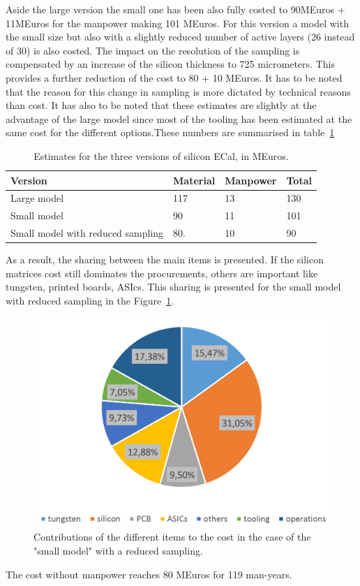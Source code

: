 Aside the large version the small one has been also fully costed to 90MEuros + 11MEuros for the manpower making 101 MEuros. For this version a model with the small size but also with a slightly reduced number of active layers (26 instead of 30) is also costed. The impact on the resolution of the sampling is compensated by an increase of the silicon thickness to 725 micrometers. This provides a further reduction of the cost to 80 + 10 MEuros. It has to be noted that the reason for this change in sampling is more dictated by technical reasons than cost. It has also to be noted that these estimates are slightly at the advantage of the large model since most of the tooling has been estimated at the same cost for the different options.These numbers are summarised in table~\ref{ECal_summary}
\begin{table}\hspace*{-0cm}\small 
\begin{tabular}[h!]{ l p{0.2\hsize}p{0.2\hsize}p{0.2\hsize} }
\toprule
Version& Material & Manpower & Total \\
\midrule
Large model                       & 117   & 13    & 130   \\
Small model                       & 90    & 11    & 101   \\
Small model with reduced sampling & 80.   & 10    & 90  \\
\bottomrule
\end{tabular}
\caption{\label{ECal_summary}Estimates for the three versions of silicon ECal, in MEuros.}
\end{table}

As a result, the sharing between the main items is presented. If the silicon matrices cost still dominates the procurements, others are important like tungsten, printed boards, ASIcs. This sharing is presented for the small model with reduced sampling in the Figure~\ref{fig:det:ECal26_Si_cost_sharing}.
\begin{figure}[h!]
\centering
\includegraphics[width=0.8\hsize]{Costing/ECal26_Si_cost_sharing.PNG}
\caption{Contributions of the different items to the cost in the case of the "small model" with a reduced sampling.}
\label{fig:det:ECal26_Si_cost_sharing}
\end{figure}
The cost without manpower reaches 80 MEuros for 119 man-years.

